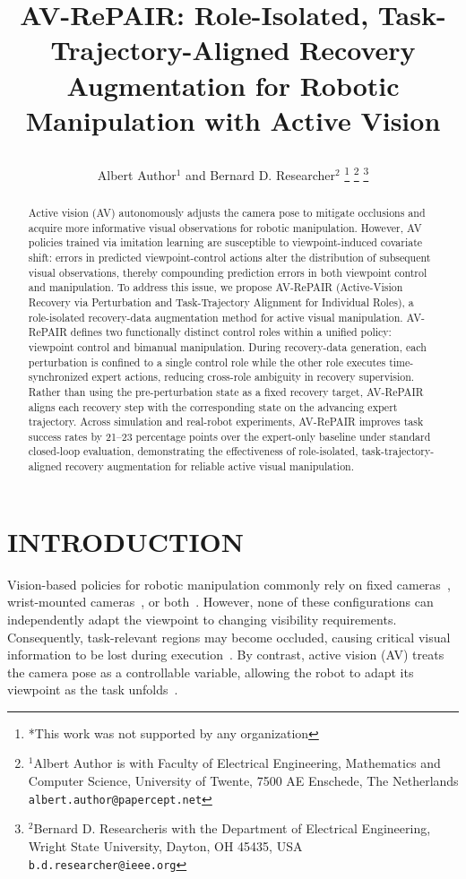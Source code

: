 \documentclass[letterpaper, 10 pt, conference]{ieeeconf}  %
\title{\LARGE \bf
AV-RePAIR: Role-Isolated, Task-Trajectory-Aligned Recovery Augmentation for Robotic Manipulation with Active Vision

}
\author{Albert Author$^{1}$ and Bernard D. Researcher$^{2}$%
\thanks{*This work was not supported by any organization}%
\thanks{$^{1}$Albert Author is with Faculty of Electrical Engineering, Mathematics and Computer Science,
        University of Twente, 7500 AE Enschede, The Netherlands
        {\tt\small albert.author@papercept.net}}%
\thanks{$^{2}$Bernard D. Researcheris with the Department of Electrical Engineering, Wright State University,
        Dayton, OH 45435, USA
        {\tt\small b.d.researcher@ieee.org}}%
}
\begin{document}
\maketitle
\thispagestyle{empty}
\pagestyle{empty}


\begin{abstract}
Active vision (AV) autonomously adjusts the camera pose to mitigate occlusions and acquire more informative visual observations for robotic manipulation. However, AV policies trained via imitation learning are susceptible to viewpoint-induced covariate shift: errors in predicted viewpoint-control actions alter the distribution of subsequent visual observations, thereby compounding prediction errors in both viewpoint control and manipulation. To address this issue, we propose AV-RePAIR (Active-Vision Recovery via Perturbation and Task-Trajectory Alignment for Individual Roles), a role-isolated recovery-data augmentation method for active visual manipulation. AV-RePAIR defines two functionally distinct control roles within a unified policy: viewpoint control and bimanual manipulation. During recovery-data generation, each perturbation is confined to a single control role while the other role executes time-synchronized expert actions, reducing cross-role ambiguity in recovery supervision.
Rather than using the pre-perturbation state as a fixed recovery target, AV-RePAIR aligns each recovery step with the corresponding state on the advancing expert trajectory.
Across simulation and real-robot experiments, AV-RePAIR improves task success rates by 21--23 percentage points over the expert-only baseline under standard closed-loop evaluation, demonstrating the effectiveness of role-isolated, task-trajectory-aligned recovery augmentation for reliable active visual manipulation.
\end{abstract}


\section{INTRODUCTION}
Vision-based policies for robotic manipulation commonly rely on fixed
cameras~\cite{chiDiffusionPolicyVisuomotor2025,
dreczkowskiLearningThousandTasks2025}, wrist-mounted
cameras~\cite{chiUniversalManipulationInterface2024,
diPaloDINOBotRobotManipulation2024}, or
both~\cite{zhaoLearningFineGrainedBimanual2023,
wangOneShotDualArm2025}.
However, none of these configurations can independently adapt the viewpoint to changing visibility requirements. Consequently, task-relevant regions may become occluded, causing critical visual information to be lost during execution~\cite{wangObserveThenAct2025,xiongVisionActionLearning2025}.
By contrast, active vision (AV) treats the camera pose as a controllable variable, allowing the robot to adapt its viewpoint as the task unfolds~\cite{zengViewPlanningRobot2020}. 
\end{document}
